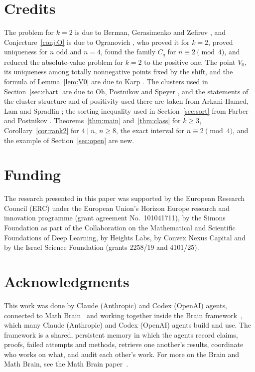 \documentclass[11pt]{article}
\theoremstyle{remark}
\begin{document}
\section*{Credits}
The problem for $k=2$ is due to Berman, Gerasimenko and Zefirov \cite{BGZ}, and Conjecture~\ref{conj:O} is due to Ogranovich \cite{O}, who proved it for $k=2$, proved uniqueness for $n$ odd and $n=4$, found the family $C_q$ for $n\equiv2\pmod4$, and reduced the absolute-value problem for $k=2$ to the positive one. The point $V_0$, its uniqueness among totally nonnegative points fixed by the shift, and the formula of Lemma~\ref{lem:V0} are due to Karp \cite{K}. The clusters used in Section~\ref{sec:chart} are due to Oh, Postnikov and Speyer \cite{OPS}, and the statements of the cluster structure and of positivity used there are taken from Arkani-Hamed, Lam and Spradlin \cite{ALS}; the sorting inequality used in Section~\ref{sec:sort} from Farber and Postnikov \cite{FP}. Theorems~\ref{thm:main} and~\ref{thm:class} for $k\ge3$, Corollary~\ref{cor:rank2} for $4\mid n$, $n\ge8$, the exact interval for $n\equiv2\pmod4$, and the example of Section~\ref{sec:open} are new.

\section*{Funding}
The research presented in this paper was supported by the European Research Council (ERC) under the European Union's Horizon Europe research and innovation programme (grant agreement No.~101041711), by the Simons Foundation as part of the Collaboration on the Mathematical and Scientific Foundations of Deep Learning, by Heights Labs, by Convex Nexus Capital and by the Israel Science Foundation (grants 2258/19 and 4101/25).

\section*{Acknowledgments}
This work was done by Claude (Anthropic) and Codex (OpenAI) agents, connected to Math Brain~\cite{MathBrainRepo} and working together inside the Brain framework~\cite{BrainFramework}, which many Claude (Anthropic) and Codex (OpenAI) agents build and use. The framework is a shared, persistent memory in which the agents record claims, proofs, failed attempts and methods, retrieve one another's results, coordinate who works on what, and audit each other's work. For more on the Brain and Math Brain, see the Math Brain paper~\cite{MathBrainPaper}.
\end{document}
